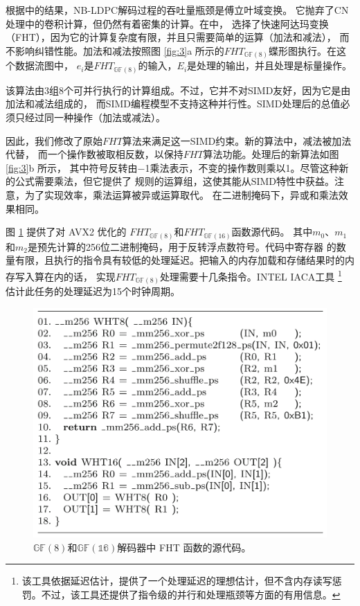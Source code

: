 \documentclass{cjc}
\begin{document}
  根据\cite{noauthor_andrade_nodate}中的结果，NB-LDPC解码过程的吞吐量瓶颈是傅立叶域变换。
  它抛弃了CN处理中的卷积计算，但仍然有着密集的计算。在\cite{noauthor_andrade_nodate}中，
  选择了快速阿达玛变换（FHT），因为它的计算复杂度有限，并且只需要简单的运算（加法和减法），
  而不影响纠错性能。加法和减法按照图 \ref{fig:3}a 所示的$FHT_{\mathbb{GF}(8)}$蝶形图执行。在这个数据流图中，
  $e_i$是$FHT_{\mathbb{GF}(8)}$的输入，$E_i$是处理的输出，并且处理是标量操作。

  该算法由3组8个可并行执行的计算组成。不过，它并不对SIMD友好，因为它是由加法和减法组成的，
  而SIMD编程模型不支持这种并行性。SIMD处理后的总值必须只经过同一种操作（加法或减法）。

  因此，我们修改了原始$FHT$算法来满足这一SIMD约束。新的算法中，减法被加法代替，
  而一个操作数被取相反数，以保持$FHT$算法功能。处理后的新算法如图 \ref{fig:3}b 所示，
  其中符号反转由−1乘法表示，不变的操作数则乘以1。尽管这种新的公式需要乘法，但它提供了
  规则的运算组，这使其能从SIMD特性中获益。注意，为了实现效率，乘法运算被异或运算取代。
  在二进制掩码下，异或和乘法效果相同。

  图 \ref{fig:4} 提供了对 AVX2 优化的 $FHT_{\mathbb{GF}(8)}$和$FHT_{\mathbb{GF}(16)}$函数源代码。
  其中$m_0$、$m_1$和$m_2$是预先计算的256位二进制掩码，用于反转浮点数符号。代码中寄存器
  的数量有限，且执行的指令具有较低的处理延迟。把输入的内存加载和存储结果时的内存写入算在内的话，
  实现$FHT_{\mathbb{GF}(8)}$处理需要十几条指令。INTEL IACA工具
  \footnote{该工具依据延迟估计，提供了一个处理延迟的理想估计，但不含内存读写惩罚。不过，该工具还提供了指令级的并行和处理瓶颈等方面的有用信息。}
  估计此任务的处理延迟为15个时钟周期。

\begin{figure}
  \includegraphics[width=\linewidth]{assets/fig4.png}
  \caption{
    $\mathbb{GF}(8)$和$\mathbb{GF(16)}$解码器中 FHT 函数的源代码。
  }\label{fig:4}
\end{figure}
\end{document}
